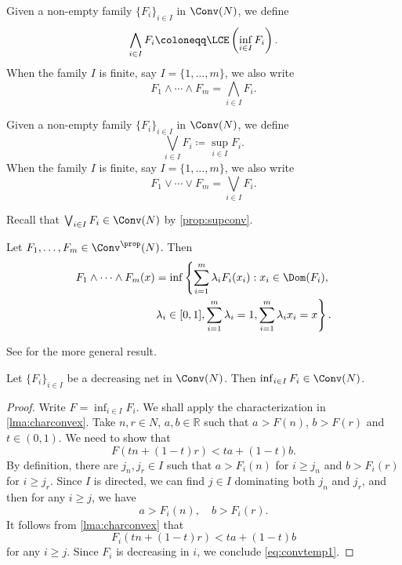 \begin{definition}\label{def:convwedge}
Given a non-empty family $\{F_i\}_{i\in I}$ in $\Conv(N)$, we define
\[
\bigwedge_{i\in I}F_i\coloneqq \LCE \left(\inf_{i\in I} F_i\right).
\]
When the family $I$ is finite, say $I=\{1,\ldots,m\}$, we also write
\[
F_1\land \cdots\land F_m=\bigwedge_{i\in I}F_i.
\]
\end{definition}
\begin{definition}\label{def:convlor}
   Given a non-empty family $\{F_i\}_{i\in I}$ in $\Conv(N)$, we define
\[
\bigvee_{i\in I}F_i\coloneqq \sup_{i\in I} F_i.
\]
When the family $I$ is finite, say $I=\{1,\ldots,m\}$, we also write
\[
F_1\lor \cdots\lor F_m=\bigvee_{i\in I}F_i.
\]
\end{definition}
Recall that $\bigvee_{i\in I}F_i\in \Conv(N)$ by \cref{prop:supconv}.

\begin{proposition}\label{prop:concavhull}
    Let $F_1,\ldots,F_m\in \Conv^{\prop}(N)$. Then
    \[
    \begin{split}
        F_1\land \cdots\land F_m(x)=\inf\left\{\sum_{i=1}^m \lambda_i F_i(x_i):x_i\in \Dom(F_i),\right.\\
        \left.\lambda_i\in [0,1],\sum_{i=1}^m\lambda_i=1, \sum_{i=1}^m\lambda_i x_i=x \right\}.
    \end{split}
    \]
\end{proposition}
See \cite[Theorem~5.6]{Roc70} for the more general result.



\begin{lemma}\label{lma:convdecnet}
    Let $\{F_i\}_{i\in I}$ be a decreasing net in $\Conv(N)$. Then $\inf_{i\in I} F_i\in \Conv(N)$.
\end{lemma}
\begin{proof}
Write $F=\inf_{i\in I} F_i$.
    We shall apply the characterization in \cref{lma:charconvex}. Take $n,r\in N$, $a,b\in \mathbb{R}$ such that $a>F(n)$, $b>F(r)$ and $t\in (0,1)$. We need to show that
    \begin{equation}\label{eq:convtemp1}
    F(tn+(1-t)r)<ta+(1-t)b.
    \end{equation}
    By definition, there are $j_n,j_r\in I$ such that $a>F_i(n)$ for $i\geq j_n$ and $b>F_i(r)$ for $i\geq j_r$. Since $I$ is directed, we can find $j\in I$ dominating both $j_n$ and $j_r$, and then for any $i\geq j$, we have
    \[
    a>F_i(n),\quad b>F_i(r).
    \]
    It follows from \cref{lma:charconvex} that
    \[
    F_i(tn+(1-t)r)<ta+(1-t)b
    \]
    for any $i\geq j$. Since $F_i$ is decreasing in $i$, we conclude \eqref{eq:convtemp1}.
\end{proof}

